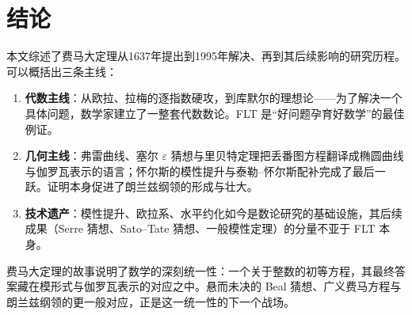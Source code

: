 \section{结论}\label{sec:conclusion}

本文综述了费马大定理从1637年提出到1995年解决、再到其后续影响的研究历程。可以概括出三条主线：

\begin{enumerate}[label=(\arabic*)]
    \item \textbf{代数主线}：从欧拉、拉梅的逐指数硬攻，到库默尔的理想论——为了解决一个具体问题，数学家建立了一整套代数数论。FLT 是“好问题孕育好数学”的最佳例证。
    \item \textbf{几何主线}：弗雷曲线、塞尔 $\varepsilon$ 猜想与里贝特定理把丢番图方程翻译成椭圆曲线与伽罗瓦表示的语言；怀尔斯的模性提升与泰勒--怀尔斯配补完成了最后一跃。证明本身促进了朗兰兹纲领的形成与壮大。
    \item \textbf{技术遗产}：模性提升、欧拉系、水平约化如今是数论研究的基础设施，其后续成果（Serre 猜想、Sato--Tate 猜想、一般模性定理）的分量不亚于 FLT 本身。
\end{enumerate}

费马大定理的故事说明了数学的深刻统一性：一个关于整数的初等方程，其最终答案藏在模形式与伽罗瓦表示的对应之中。悬而未决的 Beal 猜想、广义费马方程与朗兰兹纲领的更一般对应，正是这一统一性的下一个战场。
